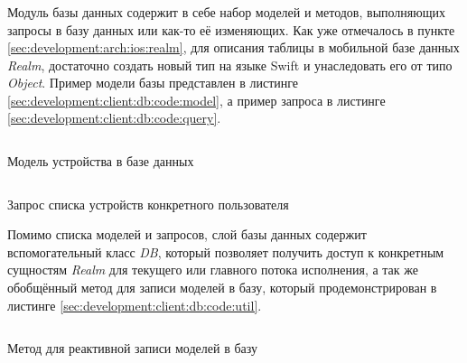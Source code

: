 \subsubsection{}
\label{sec:development:client:db}

Модуль базы данных содержит в себе набор моделей и методов, выполняющих запросы в базу данных или как-то её изменяющих. 
Как уже отмечалось в пункте \ref{sec:development:arch:ios:realm}, для описания таблицы в мобильной базе данных \textit{Realm}, достаточно создать новый тип на языке Swift и унаследовать его от типо \textit{Object}. Пример модели базы представлен в листинге \ref{sec:development:client:db:code:model}, а пример запроса в листинге \ref{sec:development:client:db:code:query}.

\begin{code}
	\inputminted{swift}{inc/src/db_model.swift}
   \caption{Модель устройства в базе данных}
   \label{sec:development:client:db:code:model}
\end{code}

\begin{code}
	\inputminted{swift}{inc/src/db_query.swift}
   \caption{Запрос списка устройств конкретного пользователя}
   \label{sec:development:client:db:code:query}
\end{code}

Помимо списка моделей и запросов, слой базы данных содержит вспомогательный класс \textit{DB}, который позволяет получить доступ к конкретным сущностям \textit{Realm} для текущего или главного потока исполнения, а так же обобщённый метод для записи моделей в базу, который продемонстрирован в листинге \ref{sec:development:client:db:code:util}.

\begin{code}
	\inputminted{swift}{inc/src/db_util.swift}
   \caption{Метод для реактивной записи моделей в базу}
   \label{sec:development:client:db:code:util}
\end{code}